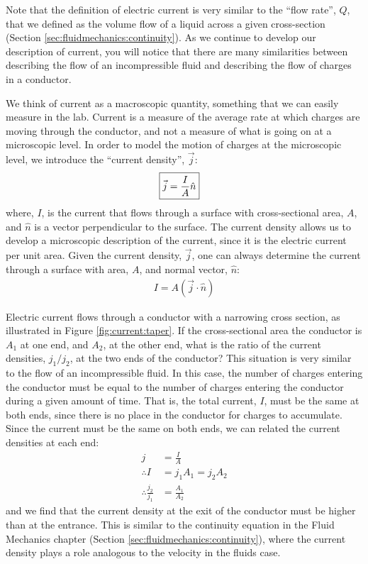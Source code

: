 Note that the definition of electric current is very similar to the ``flow rate'', $Q$, that we defined as the volume flow of a liquid across a given cross-section (Section \ref{sec:fluidmechanics:continuity}). As we continue to develop our description of current, you will notice that there are many similarities between describing the flow of an incompressible fluid and describing the flow of charges in a conductor.

We think of current as a macroscopic quantity, something that we can easily measure in the lab. Current is a measure of the average rate at which charges are moving through the conductor, and not a measure of what is going on at a microscopic level. In order to model the motion of charges at the microscopic level, we introduce the ``current density'', $\vec j$:
\begin{align*}
\Aboxed{\vec j = \frac{I}{A}\hat n}
\end{align*}
where, $I$, is the current that flows through a surface with cross-sectional area, $A$, and $\hat n$ is a vector perpendicular to the surface.  The current density allows us to develop a microscopic description of the current, since it is the electric current per unit area. Given the current density, $\vec j$, one can always determine the current through a surface with area, $A$, and normal vector, $\hat n$:
\begin{align*}
I = A(\vec j\cdot \hat n)
\end{align*}
\begin{example}{Electric current flows through a conductor with a narrowing cross section, as illustrated in Figure \ref{fig:current:taper}. If the cross-sectional area the conductor is $A_1$ at one end, and $A_2$, at the other end, what is the ratio of the current densities, $j_1/j_2$, at the two ends of the conductor?}
This situation is very similar to the flow of an incompressible fluid. In this case, the number of charges entering the conductor must be equal to the number of charges entering the conductor during a given amount of time. That is, the total current, $I$, must be the same at both ends, since there is no place in the conductor for charges to accumulate. Since the current must be the same on both ends, we can related the current densities at each end:
\begin{align*}
j&=\frac{I}{A}\\
\therefore I&=j_1A_1=j_2A_2\\
\therefore \frac{j_2}{j_1}&=\frac{A_1}{A_2}
\end{align*}
and we find that the current density at the exit of the conductor must be higher than at the entrance. This is similar to the continuity equation in the Fluid Mechanics chapter (Section \ref{sec:fluidmechanics:continuity}), where the current density plays a role analogous to the velocity in the fluids case. 
\end{example}

